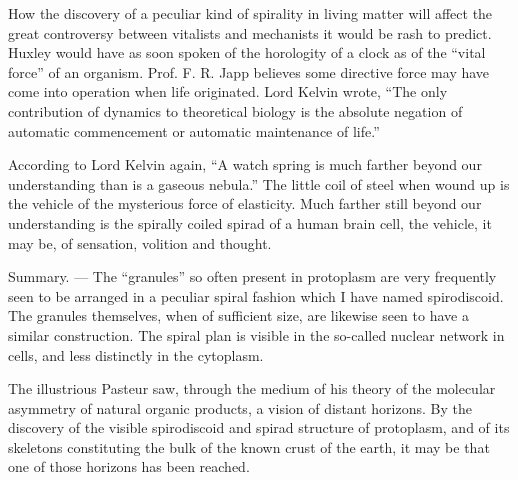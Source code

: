 \documentclass[a4paper, 12pt, oneside]{article}
\begin{document}
How the discovery of a peculiar kind of spirality in living matter will affect the great controversy between vitalists and mechanists it would be rash to predict. Huxley would have as soon spoken of the horologity of a clock as of the ``vital force'' of an organism. Prof. F. R. Japp believes some directive force may have come into operation when life originated. Lord Kelvin wrote, ``The only contribution of dynamics to theoretical biology is the absolute negation of automatic commencement or automatic maintenance of life.''

According to Lord Kelvin again, ``A watch spring is much farther beyond our understanding than is a gaseous nebula.'' The little coil of steel when wound up is the vehicle of the mysterious force of elasticity. Much farther still beyond our understanding is the spirally coiled spirad of a human brain cell, the vehicle, it may be, of sensation, volition and thought.

Summary. --- The ``granules'' so often present in protoplasm are very frequently seen to be arranged in a peculiar spiral fashion which I have named spirodiscoid. The granules themselves, when of sufficient size, are likewise seen to have a similar construction. The spiral plan is visible in the so-called nuclear network in cells, and less distinctly in the cytoplasm.

The illustrious Pasteur saw, through the medium of his theory of the molecular asymmetry of natural organic products, a vision of distant horizons. By the discovery of the visible spirodiscoid and spirad structure of protoplasm, and of its skeletons constituting the bulk of the known crust of the earth, it may be that one of those horizons has been reached.
\clearpage
\end{document}
